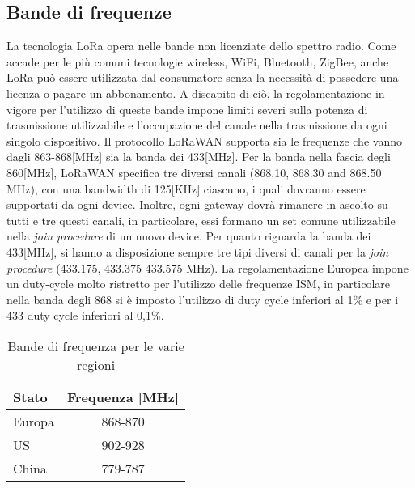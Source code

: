 \subsection{Bande di frequenze}
La tecnologia LoRa opera nelle bande non licenziate dello spettro radio.  Come
accade per le più comuni tecnologie wireless, WiFi, Bluetooth, ZigBee, anche LoRa
può essere utilizzata dal consumatore senza la necessità di possedere una
licenza o pagare un abbonamento.
A discapito di ciò, la regolamentazione in vigore per l'utilizzo di queste bande 
impone limiti severi sulla potenza di trasmissione utilizzabile e l'occupazione
del canale nella trasmissione da ogni singolo dispositivo.
Il protocollo  LoRaWAN supporta sia le frequenze che vanno dagli
863-868[MHz] sia la banda dei 433[MHz]. Per la banda  nella fascia
degli 860[MHz], LoRaWAN specifica tre diversi canali (868.10, 868.30 and 868.50
MHz), con una bandwidth di 125[KHz] ciascuno, i quali dovranno essere supportati
da ogni device. Inoltre, ogni gateway dovrà
rimanere in ascolto su tutti e tre questi canali, in particolare, essi
formano un set comune utilizzabile nella \emph{join procedure} di un nuovo
device. Per
quanto riguarda la banda dei 433[MHz], si hanno a disposizione sempre tre tipi
diversi di canali per la \emph{join procedure} (433.175, 
433.375  433.575 MHz). 
La regolamentazione Europea impone un duty-cycle molto ristretto per l'utilizzo
delle frequenze ISM, in particolare nella banda degli 868 si è imposto
l'utilizzo di duty cycle inferiori al 1\% e per i 433 duty cycle inferiori al
0,1\%.
\begin{table}[h]
        \centering
        \begin{tabular}{l|c}
                \toprule
                Stato   & Frequenza [MHz] \\
                \hline
                Europa  & 868-870 \\
                US      & 902-928 \\
                China   & 779-787 \\
                \bottomrule
        \end{tabular}
        \caption{Bande di frequenza per le varie regioni}
\end{table}

